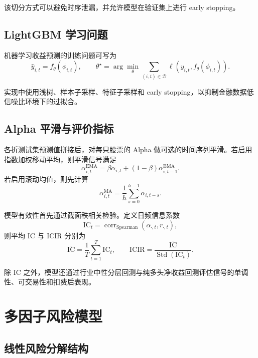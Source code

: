 \documentclass[12pt, a4paper, oneside]{article}
\newcommand{\Std}{\operatorname{Std}}
\begin{document}
该切分方式可以避免时序泄漏，并允许模型在验证集上进行 early stopping。

\subsection{LightGBM 学习问题}

机器学习收益预测的训练问题可写为
\begin{equation}
\hat y_{i,t} = f_\theta(\phi_{i,t}), \qquad \theta^\star = \arg\min_\theta \sum_{(i,t)\in\mathcal D} \ell\!\left(y_{i,t}, f_\theta(\phi_{i,t})\right).
\end{equation}

实现中使用浅树、样本子采样、特征子采样和 early stopping，以抑制金融数据低信噪比环境下的过拟合。

\subsection{Alpha 平滑与评价指标}

各折测试集预测值拼接后，对每只股票的 Alpha 做可选的时间序列平滑。若启用指数加权移动平均，则平滑信号满足
\begin{equation}
\alpha_{i,t}^{\mathrm{EMA}} = \beta \alpha_{i,t} + (1-\beta)\alpha_{i,t-1}^{\mathrm{EMA}}.
\end{equation}
若启用滚动均值，则先计算
\begin{equation}
\alpha_{i,t}^{\mathrm{MA}} = \frac{1}{h}\sum_{s=0}^{h-1}\alpha_{i,t-s}.
\end{equation}

模型有效性首先通过截面秩相关检验。定义日频信息系数
\begin{equation}
\mathrm{IC}_t = \operatorname{corr}_{\mathrm{Spearman}}(\alpha_{\cdot,t}, r_{\cdot,t}),
\end{equation}
则平均 IC 与 ICIR 分别为
\begin{equation}
\overline{\mathrm{IC}} = \frac{1}{T}\sum_{t=1}^{T}\mathrm{IC}_t, \qquad \mathrm{ICIR} = \frac{\overline{\mathrm{IC}}}{\Std(\mathrm{IC}_t)}.
\end{equation}

除 IC 之外，模型还通过行业中性分层回测与纯多头净收益回测评估信号的单调性、可交易性和扣费后表现。

\section{多因子风险模型}

\subsection{线性风险分解结构}
\end{document}

